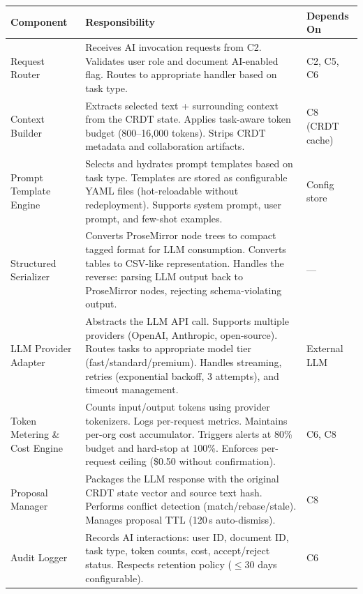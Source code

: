 \documentclass[10pt, a4paper]{article}
\begin{document}
\vspace{4pt}
{\footnotesize
\begin{tabularx}{\textwidth}{@{}lXl@{}}
\toprule
\textsf{\textbf{Component}} & \textsf{\textbf{Responsibility}} & \textsf{\textbf{Depends On}} \\
\midrule
Request Router & Receives AI invocation requests from C2. Validates user role and document AI-enabled flag. Routes to appropriate handler based on task type. & C2, C5, C6 \\
\addlinespace[2pt]
Context Builder & Extracts selected text + surrounding context from the CRDT state. Applies task-aware token budget (800--16,000 tokens). Strips CRDT metadata and collaboration artifacts. & C8 (CRDT cache) \\
\addlinespace[2pt]
Prompt Template Engine & Selects and hydrates prompt templates based on task type. Templates are stored as configurable YAML files (hot-reloadable without redeployment). Supports system prompt, user prompt, and few-shot examples. & Config store \\
\addlinespace[2pt]
Structured Serializer & Converts ProseMirror node trees to compact tagged format for LLM consumption. Converts tables to CSV-like representation. Handles the reverse: parsing LLM output back to ProseMirror nodes, rejecting schema-violating output. & --- \\
\addlinespace[2pt]
LLM Provider Adapter & Abstracts the LLM API call. Supports multiple providers (OpenAI, Anthropic, open-source). Routes tasks to appropriate model tier (fast/standard/premium). Handles streaming, retries (exponential backoff, 3 attempts), and timeout management. & External LLM \\
\addlinespace[2pt]
Token Metering \& Cost Engine & Counts input/output tokens using provider tokenizers. Logs per-request metrics. Maintains per-org cost accumulator. Triggers alerts at 80\% budget and hard-stop at 100\%. Enforces per-request ceiling (\$0.50 without confirmation). & C6, C8 \\
\addlinespace[2pt]
Proposal Manager & Packages the LLM response with the original CRDT state vector and source text hash. Performs conflict detection (match/rebase/stale). Manages proposal TTL (120\,s auto-dismiss). & C8 \\
\addlinespace[2pt]
Audit Logger & Records AI interactions: user ID, document ID, task type, token counts, cost, accept/reject status. Respects retention policy ($\le$30 days configurable). & C6 \\
\bottomrule
\end{tabularx}
}
\end{document}

